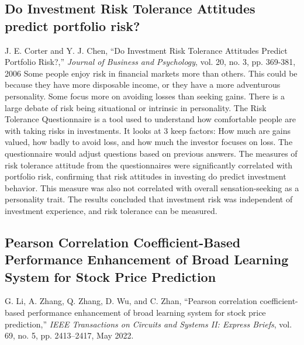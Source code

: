 \documentclass[12pt]{article}
\begin{document}
\subsection{Do Investment Risk Tolerance Attitudes predict portfolio risk?}
J. E. Corter and Y. J. Chen, “Do Investment Risk Tolerance Attitudes Predict Portfolio Risk?,” \textit{Journal of Business and Psychology}, vol. 20, no. 3, pp. 369-381, 2006
\newline
Some people enjoy risk in financial markets more than others. This could be because they have more disposable income, or they have a more adventurous personality. Some focus more on avoiding losses than seeking gains. There is a large debate of risk being situational or intrinsic in personality. The Risk Tolerance Questionnaire is a tool used to understand how comfortable people are with taking risks in investments. It looks at 3 keep factors: How much are gains valued, how badly to avoid loss, and how much the investor focuses on loss. The questionnaire would adjust questions based on previous answers. The measures of risk tolerance attitude from the questionnaires were significantly correlated with portfolio risk, confirming that risk attitudes in investing do predict investment behavior. This measure was also not correlated with overall sensation-seeking as a personality trait. The results concluded that investment risk was independent of investment experience, and risk tolerance can be measured.


\subsection{Pearson Correlation Coefficient-Based Performance Enhancement of Broad Learning System for Stock Price Prediction}
G. Li, A. Zhang, Q. Zhang, D. Wu, and C. Zhan, “Pearson correlation coefficient-based performance enhancement of broad learning system for stock price prediction,” \textit{IEEE Transactions on Circuits and Systems II: Express Briefs}, vol. 69, no. 5, pp. 2413–2417, May 2022. %
\newline
\end{document}
